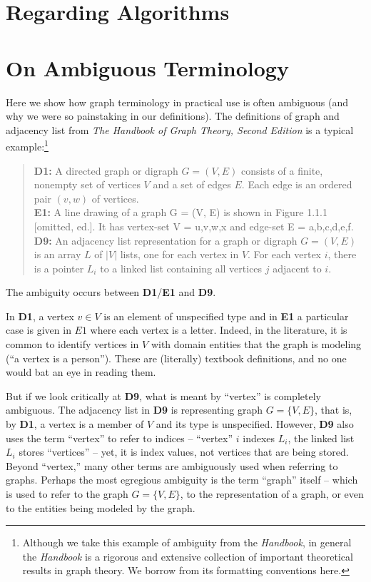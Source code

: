 \section{Regarding Algorithms}


\appendix

\section{On Ambiguous Terminology}
\label{sec:ambiguity}

Here we show how graph terminology in practical use is often ambiguous (and why we were so painstaking in our definitions).
The definitions of graph and adjacency list from \emph{The Handbook of Graph Theory, Second Edition} is a typical
example:\footnote{
Although we take this example of ambiguity
from the \emph{Handbook}, in general the \emph{Handbook} is a rigorous and extensive collection of
important theoretical results in graph theory.  We borrow from its formatting conventions here.
}
\begin{quote}
  \textbf{D1:} A directed graph or digraph $G = (V,E)$ consists of a finite, nonempty set of vertices $V$ and a set of edges $E$.
Each edge is an ordered pair $(v,w)$ of vertices.
\\[\medskipamount]
\textbf{E1:} A line drawing of a graph G = (V, E) is shown in Figure 1.1.1 [omitted, ed.]. It has vertex-set V = {u,v,w,x} and
edge-set E = {a,b,c,d,e,f}.
\\[\medskipamount]
\textbf{D9:} An adjacency list representation for a graph or digraph $G = (V, E)$ is an array $L$ of $|V|$ lists, one for each
vertex in $V$. For each vertex $i$, there is a pointer $L_i$ to a linked list containing all vertices $j$ adjacent to $i$.
\end{quote}
The ambiguity occurs between \textbf{D1}/\textbf{E1} and \textbf{D9}.

In \textbf{D1}, a vertex $v \in V$ is an element of unspecified type and in \textbf{E1} a particular case is given in $E1$ where
each vertex is a letter.  Indeed, in the literature, it is common to identify vertices in $V$ with domain entities that the graph
is modeling (``a vertex is a person'').  These are (literally) textbook definitions, and no one would bat an eye in reading them.

But if we look critically at \textbf{D9}, what is meant by ``vertex'' is completely ambiguous.  The adjacency list
in \textbf{D9} is representing graph $G=\{ V, E\}$, that is, by \textbf{D1}, a vertex is a member of $V$ and its type is
unspecified.  However, \textbf{D9} also uses the term ``vertex'' to refer to indices -- ``vertex'' $i$ indexes $L_i$, the linked list   
$L_i$ stores ``vertices'' -- yet, it is index values, not vertices that are being stored.  Beyond ``vertex,'' many other terms are
 ambiguously used when referring to graphs.  Perhaps the most egregious ambiguity is the term ``graph'' itself -- which is used to 
refer to the graph $G=\{ V, E \}$, to the representation of a graph, or even to the entities being modeled by the graph.

